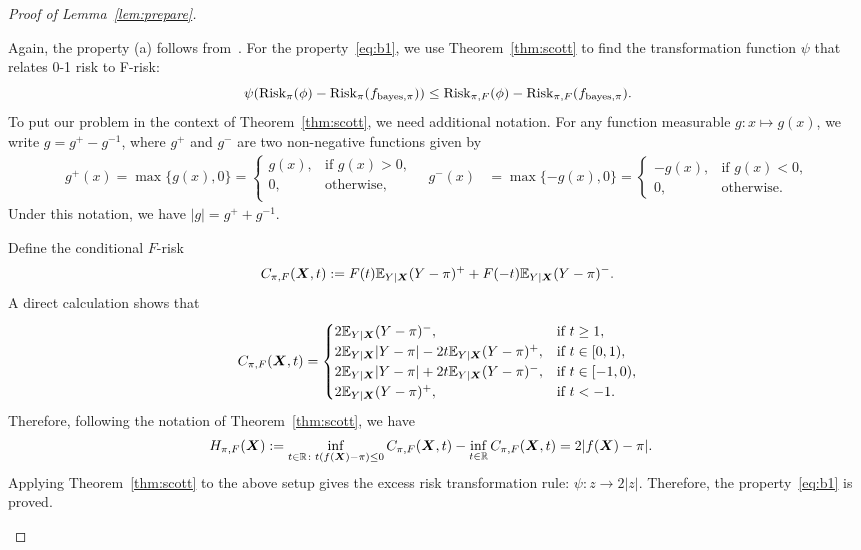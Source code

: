 \documentclass[11pt]{article}
\theoremstyle{plain}
\theoremstyle{definition}
\def\bayespif{f_{\textup{bayes},\pi}}
\def\risk{\textup{Risk}_\pi}
\def\riskF{\textup{Risk}_{\pi,F}}
\begin{document}
\begin{proof}[Proof of Lemma~\ref{lem:prepare}]
\begin{enumerate}[label={2.\arabic*},wide, labelwidth=!, labelindent=0pt]
Again, the property (a) follows from~\citet[Lemma 1]{wang2008probability}. For the property~\eqref{eq:b1}, we use Theorem~\ref{thm:scott} to find the transformation function $\psi$ that relates 0-1 risk to F-risk:
\[
\psi(\risk(\phi)-\risk(\bayespif))\leq \riskF(\phi)-\riskF(\bayespif). 
\]
To put our problem in the context of Theorem~\ref{thm:scott}, we need additional notation. For any function measurable $g\colon x\mapsto g(x)$, we write $g=g^{+}-g^{-1}$, where $g^{+}$ and $g^{-}$ are two non-negative functions given by
\begin{align}
g^{+}(x)=\max\{ g(x),0 \} =
\begin{cases}
g(x), & \text{if }g(x)>0,\\
0, & \text{otherwise},\\
\end{cases}\quad 
g^{-}(x)&=\max\{ -g(x),0 \} =
\begin{cases}
-g(x), & \text{if }g(x)<0,\\
0, & \text{otherwise}.
\end{cases}
\end{align}
Under this notation, we have $|g|=g^{+}+g^{-1}$. 

Define the conditional $F$-risk
\[
C_{\pi,F}(\bm X,t):=F(t)\mathbb{E}_{Y|\bm X}(Y-\pi)^{+}+F(-t)\mathbb{E}_{Y|\bm X}(Y-\pi)^{-}.
\]
A direct calculation shows that
\[
C_{\pi,F}(\bm X,t)=
\begin{cases}
2\mathbb{E}_{Y|\bm X}(Y-\pi)^{-}, & \text{if }t\geq 1,\\
2\mathbb{E}_{Y|\bm X}|Y-\pi|-2t\mathbb{E}_{Y|\bm X}(Y-\pi)^{+},  &\text{if }t\in[0,1),\\
2\mathbb{E}_{Y|\bm X}|Y-\pi|+2t\mathbb{E}_{Y|\bm X}(Y-\pi)^{-},  &\text{if }t\in[-1,0),\\
2\mathbb{E}_{Y|\bm X}(Y-\pi)^{+}, & \text{if }t<-1.
\end{cases}
\]
Therefore, following the notation of Theorem~\ref{thm:scott}, we have
\begin{align}
H_{\pi,F}(\bm X)&:=\inf_{t\in\mathbb{R}\colon t(f(\bm X)-\pi)\leq 0}C_{\pi,F}(\bm X, t)-\inf_{t\in\mathbb{R}} C_{\pi,F}(\bm X, t) = 2|f(\bm X)-\pi|.
\end{align}
Applying Theorem~\ref{thm:scott} to the above setup gives the excess risk transformation rule: $\psi: z\to2|z|$. Therefore, the property~\eqref{eq:b1} is proved. 


\end{enumerate}
\end{proof}
\end{document}
